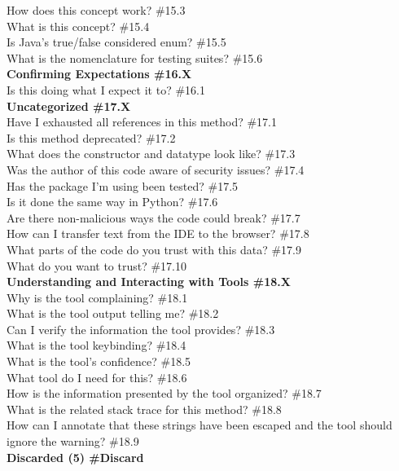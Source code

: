 \documentclass[10pt,journal,compsoc]{IEEEtran}
\begin{document}
	How does this concept work? \#15.3 \\
	What is this concept? \#15.4 \\
	Is Java's true/false considered enum? \#15.5 \\
	What is the nomenclature for testing suites? \#15.6 \\
\textbf{Confirming Expectations  \#16.X} \\
	Is this doing what I expect it to? \#16.1 \\
\textbf{Uncategorized  \#17.X} \\
	Have I exhausted all references in this method? \#17.1 \\
	Is this method deprecated? \#17.2 \\
	What does the constructor and datatype look like? \#17.3 \\
	Was the author of this code aware of security issues? \#17.4 \\
	Has the package I'm using been tested? \#17.5 \\
	Is it done the same way in Python? \#17.6 \\
	Are there non-malicious ways the code could break? \#17.7 \\
	How can I transfer text from the IDE to the browser? \#17.8 \\
	What parts of the code do you trust with this data? \#17.9 \\
	What do you want to trust? \#17.10 \\
\textbf{Understanding and Interacting with Tools \#18.X} \\
	Why is the tool complaining? \#18.1 \\
	What is the tool output telling me?  \#18.2 \\
	Can I verify the information the tool provides? \#18.3 \\
	What is the tool keybinding?  \#18.4 \\
	What is the tool's confidence? \#18.5 \\
	What tool do I need for this?  \#18.6 \\
	How is the information presented by the tool organized?  \#18.7 \\
	What is the related stack trace for this method? \#18.8 \\
	How can I annotate that these strings have been escaped and the tool should ignore the warning? \#18.9 \\
\textbf{Discarded (5) \#Discard}
\end{document}
